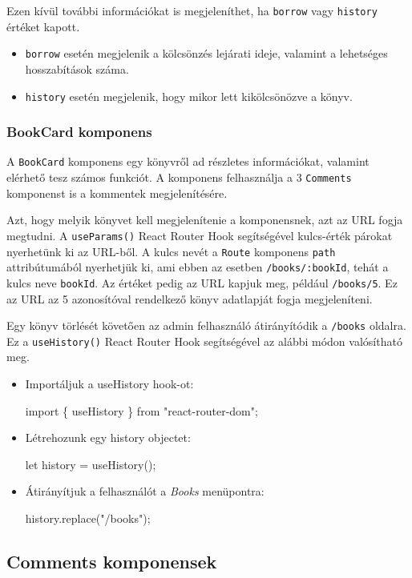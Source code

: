 Ezen kívül további információkat is megjeleníthet, ha \texttt{borrow} vagy \texttt{history} értéket kapott.
\begin{itemize}
    \item \texttt{borrow} esetén megjelenik a kölcsönzés lejárati ideje, valamint a lehetséges hosszabítások száma.
    \item \texttt{history} esetén megjelenik, hogy mikor lett kikölcsönözve a könyv.
\end{itemize}

\subsubsection{BookCard komponens}

A \texttt{BookCard} komponens egy könyvről ad részletes információkat, valamint elérhető tesz számos funkciót. A komponens felhasználja a 3 \texttt{Comments} komponenst is a kommentek megjelenítésére.

Azt, hogy melyik könyvet kell megjelenítenie a komponensnek, azt az URL fogja megtudni. A \texttt{useParams()} React Router Hook segítségével kulcs-érték párokat nyerhetünk ki az URL-ből. A kulcs nevét a \texttt{Route} komponens \texttt{path} attribútumából nyerhetjük ki, ami ebben az esetben \texttt{/books/:bookId}, tehát a kulcs neve \texttt{bookId}. Az értéket pedig az URL kapjuk meg, például \texttt{/books/5}. Ez az URL az 5 azonosítóval rendelkező könyv adatlapját fogja megjeleníteni.

Egy könyv törlését követően az admin felhasználó átirányítódik a \texttt{/books} oldalra. Ez a \texttt{useHistory()} React Router Hook segítségével az alábbi módon valósítható meg.
\begin{itemize}
\item Importáljuk a useHistory hook-ot:
\begin{java}
import \{ useHistory \} from "react-router-dom";
\end{java}
\item Létrehozunk egy history objectet:
\begin{java}
let history = useHistory();
\end{java}
\item Átirányítjuk a felhasználót a \textit{Books} menüpontra:
\begin{java}
history.replace("/books");
\end{java}
\end{itemize}

\subsection{Comments komponensek}

